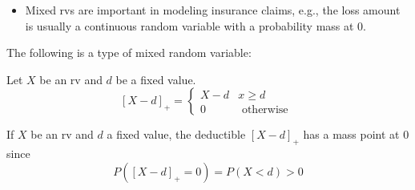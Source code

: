 \documentclass[notoc,notitlepage]{tufte-book}
\begin{document}
\begin{note}
  \begin{itemize}
    \item Mixed rvs are important in modeling insurance claims, e.g., the loss amount is usually a continuous random variable with a probability mass at $0$.
  \end{itemize}
\end{note}

The following is a type of mixed random variable:

\begin{defn}[Deductibles]\label{defn:deductibles}
  Let $X$ be an rv and $d$ be a fixed value.
  \begin{equation*}
    {[ X - d ]}_+ = \begin{cases}
      X - d & x \geq d \\
      0     & \text{ otherwise }
    \end{cases}
  \end{equation*}
\end{defn}

\begin{note}
  If $X$ be an rv and $d$ a fixed value, the deductible ${[X - d]}_+$ has a mass point at $0$ since
  \begin{equation*}
    P( {[ X - d ]}_+ = 0 ) = P(X < d) > 0
  \end{equation*}
\end{note}
\end{document}
